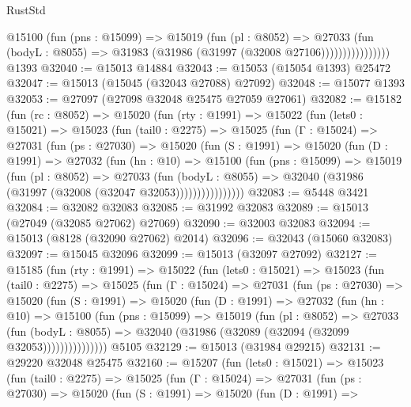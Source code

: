 \begin{lexlean}{RustStd}
\begin{coremodule}
                      @15100
                        (fun (pns : @15099) =>
                        @15019
                          (fun (pl : @8052) =>
                          @27033
                            (fun (bodyL : @8055) =>
                            @31983 (@31986 (@31997 (@32008 @27106))))))))))))))))
    @1393
@32040 := @15013 @14884
@32043 := @15053 (@15054 @1393) @25472
@32047 := @15013 (@15045 (@32043 @27088) @27092)
@32048 := @15077 @1393
@32053 := @27097 (@27098 @32048 @25475 @27059 @27061)
@32082 := @15182
    (fun (rc : @8052) =>
    @15020
      (fun (rty : @1991) =>
      @15022
        (fun (lets0 : @15021) =>
        @15023
          (fun (tail0 : @2275) =>
          @15025
            (fun (Γ : @15024) =>
            @27031
              (fun (ps : @27030) =>
              @15020
                (fun (S : @1991) =>
                @15020
                  (fun (D : @1991) =>
                  @27032
                    (fun (hn : @10) =>
                    @15100
                      (fun (pns : @15099) =>
                      @15019
                        (fun (pl : @8052) =>
                        @27033
                          (fun (bodyL : @8055) =>
                          @32040 (@31986 (@31997 (@32008 (@32047 @32053))))))))))))))))
@32083 := @5448 @3421
@32084 := @32082 @32083
@32085 := @31992 @32083
@32089 := @15013 (@27049 (@32085 @27062) @27069)
@32090 := @32003 @32083
@32094 := @15013 (@8128 (@32090 @27062) @2014)
@32096 := @32043 (@15060 @32083)
@32097 := @15045 @32096
@32099 := @15013 (@32097 @27092)
@32127 := @15185
    (fun (rty : @1991) =>
    @15022
      (fun (lets0 : @15021) =>
      @15023
        (fun (tail0 : @2275) =>
        @15025
          (fun (Γ : @15024) =>
          @27031
            (fun (ps : @27030) =>
            @15020
              (fun (S : @1991) =>
              @15020
                (fun (D : @1991) =>
                @27032
                  (fun (hn : @10) =>
                  @15100
                    (fun (pns : @15099) =>
                    @15019
                      (fun (pl : @8052) =>
                      @27033
                        (fun (bodyL : @8055) =>
                        @32040 (@31986 (@32089 (@32094 (@32099 @32053)))))))))))))))
    @5105
@32129 := @15013 (@31984 @29215)
@32131 := @29220 @32048 @25475
@32160 := @15207
    (fun (lets0 : @15021) =>
    @15023
      (fun (tail0 : @2275) =>
      @15025
        (fun (Γ : @15024) =>
        @27031
          (fun (ps : @27030) =>
          @15020
            (fun (S : @1991) =>
            @15020
              (fun (D : @1991) =>

\end{coremodule}
\end{lexlean}
